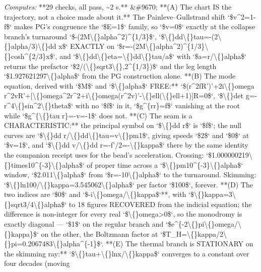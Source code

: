 \begin{description}
\emph{Computes:} **29 checks, all pass, \textasciitilde{}2 s.** \&\#9670; **(A) The chart IS the trajectory, not a choice made about it.** The Painleve--Gullstrand shift `\$v\textasciicircum{}2=1-f\$` makes PG's congruence the `\$E=1\$` family, so `\$v=0\$` exactly at the collapse branch's turnaround `\$-(2M\textbackslash\{\}alpha\textasciicircum{}2)\textasciicircum{}\{1/3\}\$`, `\$\textbackslash\{\}dd\textbackslash\{\}tau=-(2\textbackslash\{\}alpha/3)\textbackslash\{\}dd x\$` EXACTLY on `\$r=-(2M\textbackslash\{\}alpha\textasciicircum{}2)\textasciicircum{}\{1/3\}\textbackslash\{\}cosh\textasciicircum{}\{2/3\}x\$`, and `\$\textbackslash\{\}dd\textbackslash\{\}eta=\textbackslash\{\}dd\textbackslash\{\}tau/a\$` with `\$a=\textbar{}r\textbar{}/\textbackslash\{\}alpha\$` returns the prefactor `\$2/(\textbackslash\{\}sqrt3\textbackslash\{\},2\textasciicircum{}\{1/3\})\$` and the leg length `\$1.927621297\textbackslash\{\}alpha\$` from the PG construction alone. **(B) The mode equation, derived with `\$M\$` and `\$\textbackslash\{\}alpha\$` FREE:** `\$(r\textasciicircum{}2fR')'+2i\textbackslash\{\}omega r\textasciicircum{}2vR'+[\textbackslash\{\}omega\textasciicircum{}2r\textasciicircum{}2+i\textbackslash\{\}omega(r\textasciicircum{}2v)'-\textbackslash\{\}ell(\textbackslash\{\}ell+1)]R=0\$`, `\$\textbackslash\{\}det g=-r\textasciicircum{}4\textbackslash\{\}sin\textasciicircum{}2\textbackslash\{\}theta\$` with no `\$f\$` in it, `\$g\textasciicircum{}\{rr\}=f\$` vanishing at the root while `\$g\textasciicircum{}\{\textbackslash\{\}tau r\}=-v=-1\$` does not. **(C) The seam is a CHARACTERISTIC:** the principal symbol on `\$\textbackslash\{\}dd r\$` is `\$f\$`; the null curves are `\$\textbackslash\{\}dd r/\textbackslash\{\}dd\textbackslash\{\}tau=v\textbackslash\{\}pm1\$`, giving speeds `\$2\$` and `\$0\$` at `\$v=1\$`, and `\$\textbackslash\{\}dd v/\textbackslash\{\}dd r=-f'/2=-\textbackslash\{\}kappa\$` there by the same identity the companion receipt uses for the bead's acceleration. Crossing: `\$1.000000219\textbackslash\{\}times10\textasciicircum{}\{-3\}\textbackslash\{\}alpha\$` of proper time across a `\$\textbackslash\{\}pm10\textasciicircum{}\{-3\}\textbackslash\{\}alpha\$` window, `\$2.011\textbackslash\{\}alpha\$` from `\$r=-10\textbackslash\{\}alpha\$` to the turnaround. Skimming: `\$\textbackslash\{\}ln100/\textbackslash\{\}kappa=3.545062\textbackslash\{\}alpha\$` per factor `\$100\$`, forever. **(D) The two indices are `\$0\$` and `\$-i\textbackslash\{\}omega/\textbackslash\{\}kappa\$`**, with `\$\textbackslash\{\}kappa=3\textbackslash\{\}sqrt3/4\textbackslash\{\}alpha\$` to 18 figures RECOVERED from the indicial equation; the difference is non-integer for every real `\$\textbackslash\{\}omega>0\$`, so the monodromy is exactly diagonal --- `\$1\$` on the regular branch and `\$e\textasciicircum{}\{-2\textbackslash\{\}pi\textbackslash\{\}omega/\textbackslash\{\}kappa\}\$` on the other, the Boltzmann factor at `\$T\_H=\textbackslash\{\}kappa/2\textbackslash\{\}pi=0.2067483\textbackslash\{\}alpha\textasciicircum{}\{-1\}\$`. **(E) The thermal branch is STATIONARY on the skimming ray:** `\$\textbackslash\{\}tau+\textbackslash\{\}ln\textbar{}x\textbar{}/\textbackslash\{\}kappa\$` converges to a constant over four decades (moving 
\end{description}
